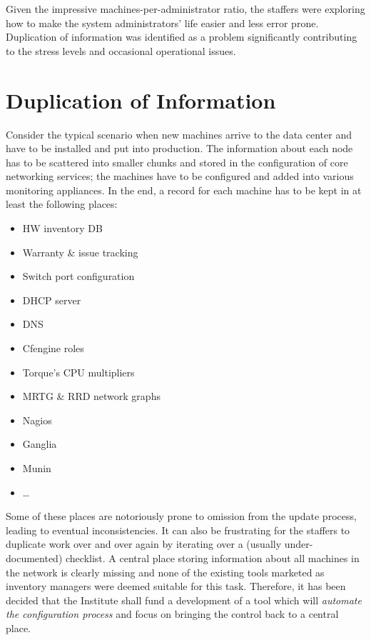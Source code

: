 \documentclass[a4paper]{jpconf}
\begin{document}
Given the impressive machines-per-administrator ratio, the staffers were exploring how to make the system administrators' life easier
and less error prone.  Duplication of information was identified as a problem significantly contributing to the stress levels and
occasional operational issues.

\section{Duplication of Information}

Consider the typical scenario when new machines arrive to the data center and have to be installed and put into
production.  The information about each node has to be scattered into smaller chunks and stored in the configuration of core networking
services; the machines have to be configured and added into various monitoring appliances.  In the end, a record for each machine has
to be kept in at least the following places:

\begin{itemize}
    \item HW inventory DB
    \item Warranty \& issue tracking
    \item Switch port configuration
    \item DHCP server
    \item DNS
    \item Cfengine roles
    \item Torque's CPU multipliers
    \item MRTG \& RRD network graphs
    \item Nagios
    \item Ganglia
    \item Munin
    \item \ldots
\end{itemize}

Some of these places are notoriously prone to omission from the update process, leading to eventual inconsistencies.  It can also be
frustrating for the staffers to duplicate work over and over again by iterating over a (usually under-documented) checklist.  A central
place storing information about all machines in the network is clearly missing and none of the existing tools marketed as inventory
managers were deemed suitable for this task.  Therefore, it has been decided that the Institute shall fund a development of a tool
which will {\em automate the configuration process} and focus on bringing the control back to a central place.
\end{document}
